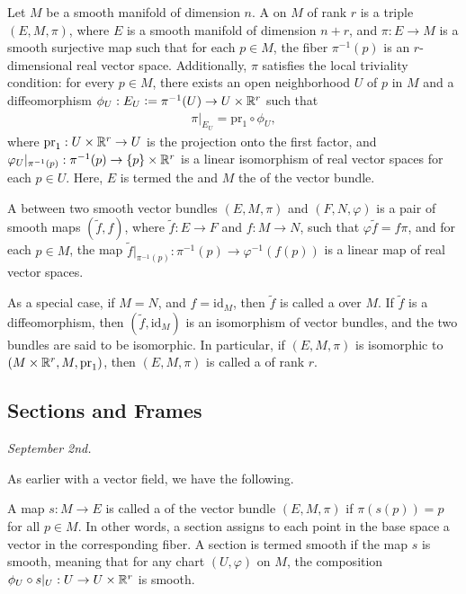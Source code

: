 \begin{definition}
    Let $M$ be a smooth manifold of dimension $n$. A  on $M$ of rank $r$ is a triple $(E,M,\pi)$, where $E$ is a smooth manifold of dimension $n+r$, and $\pi:E \to M$ is a smooth surjective map such that for each $p \in M$, the fiber $\pi^{-1}(p)$ is an $r$-dimensional real vector space. Additionally, $\pi$ satisfies the local triviality condition: for every $p \in M$, there exists an open neighborhood $U$ of $p$ in $M$ and a diffeomorphism $\phi_{U}: E_{U} \vcentcolon= \pi^{-1}(U) \to U \times \mathbb{R}^{r}$ such that
    \begin{align}
        \pi|_{E_{U}} = \text{pr}_{1} \circ \phi_{U},
    \end{align}
    where $\text{pr}_{1}: U \times \mathbb{R}^{r} \to U$ is the projection onto the first factor, and $\varphi_{U}|_{\pi^{-1}(p)}: \pi^{-1}(p) \to \{p\} \times \mathbb{R}^{r}$ is a linear isomorphism of real vector spaces for each $p \in U$. Here, $E$ is termed the  and $M$ the  of the vector bundle.
\end{definition}

\begin{definition}
    A  between two smooth vector bundles $(E,M,\pi)$ and $(F,N,\varphi)$ is a pair of smooth maps $(\tilde{f},f)$, where $\tilde{f}:E \to F$ and $f:M \to N$, such that $\varphi \tilde{f} = f \pi$, and for each $p \in M$, the map $\tilde{f}|_{\pi^{-1}(p)}: \pi^{-1}(p) \to \varphi^{-1}(f(p))$ is a linear map of real vector spaces. 
\end{definition}
As a special case, if $M = N$, and $f = \text{id}_{M}$, then $\tilde{f}$ is called a  over $M$. If $\tilde{f}$ is a diffeomorphism, then $(\tilde{f},\text{id}_{M})$ is an isomorphism of vector bundles, and the two bundles are said to be isomorphic. In particular, if $(E,M,\pi)$ is isomorphic to $(M \times \mathbb{R}^{r},M,\text{pr}_{1})$, then $(E,M,\pi)$ is called a  of rank $r$.
\subsection{Sections and Frames}
\textit{September 2nd.}

As earlier with a vector field, we have the following.

\begin{definition}
    A map $s:M \to E$ is called a  of the vector bundle $(E,M,\pi)$ if $\pi(s(p)) = p$ for all $p \in M$. In other words, a section assigns to each point in the base space a vector in the corresponding fiber. A section is termed smooth if the map $s$ is smooth, meaning that for any chart $(U,\varphi)$ on $M$, the composition $\phi_{U} \circ s|_{U}: U \to U \times \mathbb{R}^{r}$ is smooth.
\end{definition}

